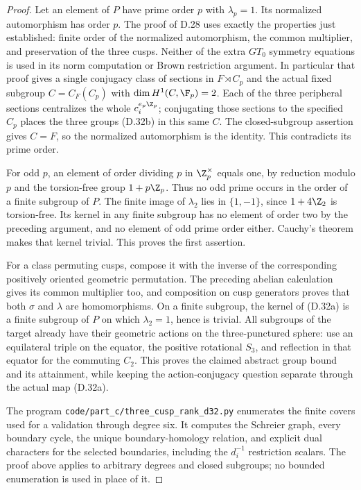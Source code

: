 \begin{proof}
Let an element of $P$ have prime order $p$ with $\lambda_p=1$.
Its normalized automorphism has order $p$.  The proof of D.28
uses exactly the properties just established: finite order of the
normalized automorphism, the common multiplier, and preservation
of the three cusps.  Neither of the extra $GT_0$ symmetry equations
is used in its norm computation or Brown restriction argument.
In particular that proof gives a single conjugacy class of
sections in $F\rtimes C_p$ and the actual fixed subgroup
$C=C_F(C_p)$ with $\dim H^1(C,\F_p)=2$.
Each of the three peripheral sections centralizes the whole
$c_i^{e_p\Z_p}$; conjugating those sections to the specified
$C_p$ places the three groups (D.32b) in this same $C$.
The closed-subgroup assertion gives $C=F$, so the normalized
automorphism is the identity.  This contradicts its prime order.

For odd $p$, an element of order dividing $p$ in
$\Z_p^\times$ equals one, by reduction modulo $p$ and the
torsion-free group $1+p\Z_p$.  Thus no odd prime occurs in
the order of a finite subgroup of $P$.  The finite image of
$\lambda_2$ lies in $\{1,-1\}$, since $1+4\Z_2$ is
torsion-free.  Its kernel in any finite subgroup has no element
of order two by the preceding argument, and no element of odd
prime order either.  Cauchy's theorem makes that kernel trivial.
This proves the first assertion.

For a class permuting cusps, compose it with the inverse of the
corresponding positively oriented geometric permutation.  The
preceding abelian calculation gives its common multiplier too,
and composition on cusp generators proves that both $\sigma$
and $\lambda$ are homomorphisms.  On a finite subgroup, the
kernel of (D.32a) is a finite subgroup of $P$ on which
$\lambda_2=1$, hence is trivial.  All subgroups of the target
already have their geometric actions on the three-punctured
sphere: use an equilateral triple on the equator, the positive
rotational $S_3$, and reflection in that equator for the
commuting $C_2$.  This proves the claimed abstract group bound
and its attainment, while keeping the action-conjugacy question
separate through the actual map (D.32a).

The program \texttt{code/part\_c/three\_cusp\_rank\_d32.py}
enumerates the finite covers used for a validation through degree
six.  It computes the Schreier graph, every boundary cycle,
the unique boundary-homology relation, and explicit dual
characters for the selected boundaries, including the
$d_i^{-1}$ restriction scalars.  The proof above applies to
arbitrary degrees and closed subgroups; no bounded enumeration
is used in place of it.
\end{proof}
